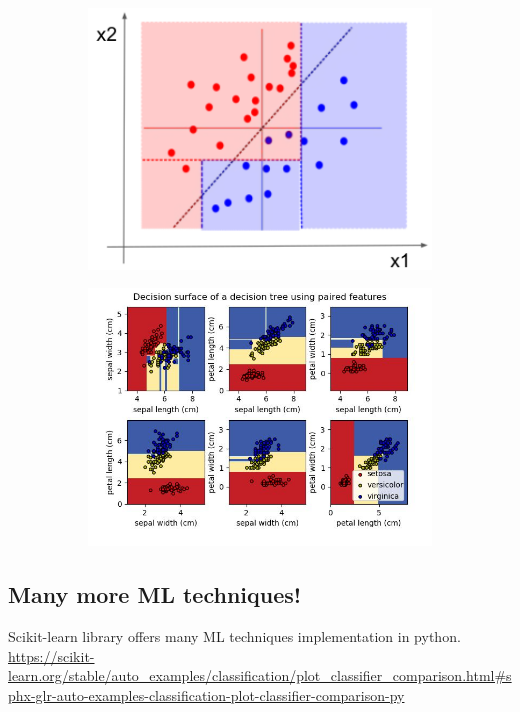 \begin{figure}[ht]
	\centering
	\begin{subfigure}{.4\textwidth}
		\centering
		\includegraphics[width=0.9\linewidth]{figure_ml/limitations_trees.png}
	\end{subfigure}%
	\begin{subfigure}{.6\textwidth}
		\centering
		\includegraphics[width=0.9\linewidth]{figure_ml/limitations_trees2.png}
	\end{subfigure}
\end{figure}




\subsection{Many more ML techniques!}

Scikit-learn library offers many ML techniques implementation in python.\\
\url{https://scikit-learn.org/stable/auto_examples/classification/plot_classifier_comparison.html#sphx-glr-auto-examples-classification-plot-classifier-comparison-py}

